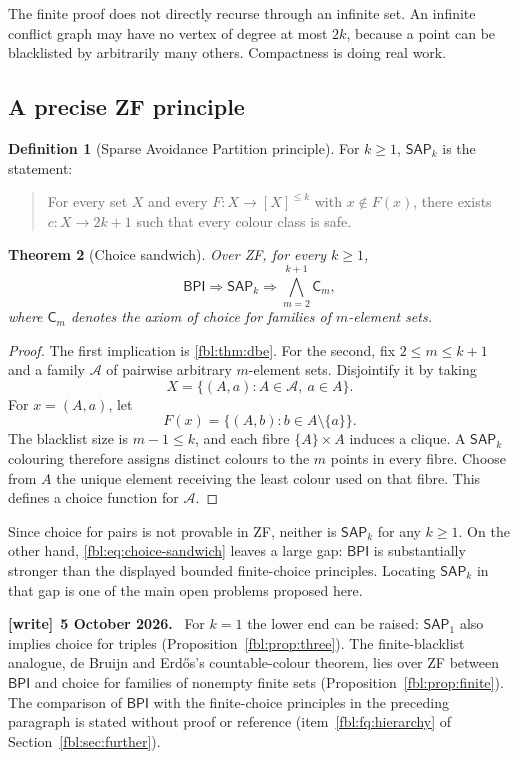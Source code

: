 \documentclass[11pt]{article}
\newtheorem{theorem}{Theorem}[section]
\theoremstyle{definition}
\newtheorem{definition}[theorem]{Definition}
\theoremstyle{remark}
\newcommand{\cA}{\mathcal A}
\newcommand{\BPI}{\mathsf{BPI}}
\newcommand{\SAP}{\mathsf{SAP}}
\newcommand{\Cm}{\mathsf{C}}
\newenvironment{writenote}[1][]{\par\smallskip\begingroup\small
 \noindent\textbf{[write]}\if\relax\detokenize{#1}\relax\else~\textbf{#1.}\fi\ }%
 {\par\endgroup\smallskip}
\begin{document}
The finite proof does not directly recurse through an infinite set.  An
infinite conflict graph may have no vertex of degree at most $2k$, because a
point can be blacklisted by arbitrarily many others.  Compactness is doing
real work.

\subsection{A precise ZF principle}

\begin{definition}[Sparse Avoidance Partition principle]
For $k\ge1$, $\SAP_k$ is the statement:
\begin{quote}
For every set $X$ and every $F:X\to[X]^{\le k}$ with $x\notin F(x)$, there
exists $c:X\to 2k+1$ such that every colour class is safe.
\end{quote}
\end{definition}

\begin{theorem}[Choice sandwich]\label{fbl:thm:choice-sandwich}
Over ZF, for every $k\ge1$,
\begin{equation}\label{fbl:eq:choice-sandwich}
 \BPI
 \Longrightarrow \SAP_k
 \Longrightarrow
 \bigwedge_{m=2}^{k+1}\Cm_m,
\end{equation}
where $\Cm_m$ denotes the axiom of choice for families of $m$-element sets.
\end{theorem}

\begin{proof}
The first implication is \cref{fbl:thm:dbe}.  For the second, fix
$2\le m\le k+1$ and a family $\cA$ of pairwise arbitrary $m$-element sets.
Disjointify it by taking
\[
 X=\{(A,a):A\in\cA,\ a\in A\}.
\]
For $x=(A,a)$, let
\[
 F(x)=\{(A,b):b\in A\setminus\{a\}\}.
\]
The blacklist size is $m-1\le k$, and each fibre
$\{A\}\times A$ induces a clique.  A $\SAP_k$ colouring therefore assigns
distinct colours to the $m$ points in every fibre.  Choose from $A$ the
unique element receiving the least colour used on that fibre.  This defines
a choice function for $\cA$.
\end{proof}

Since choice for pairs is not provable in ZF, neither is $\SAP_k$ for any
$k\ge1$.  On the other hand, \cref{fbl:eq:choice-sandwich} leaves a large gap:
$\BPI$ is substantially stronger than the displayed bounded finite-choice
principles.  Locating $\SAP_k$ in that gap is one of the main open problems
proposed here.

\begin{writenote}[5 October 2026]
For $k=1$ the lower end can be raised: $\SAP_1$ also implies choice for
triples (Proposition~\ref{fbl:prop:three}). The finite-blacklist analogue,
de Bruijn and Erd\H{o}s's countable-colour theorem, lies over ZF between
$\BPI$ and choice for families of nonempty finite sets
(Proposition~\ref{fbl:prop:finite}). The comparison of $\BPI$ with the
finite-choice principles in the preceding paragraph is stated without proof
or reference (item~\ref{fbl:fq:hierarchy} of
Section~\ref{fbl:sec:further}).
\end{writenote}
\end{document}
